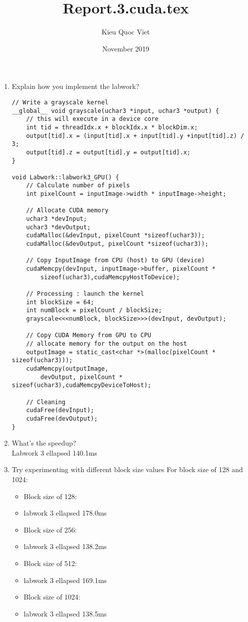 \documentclass{article}
\title{Report.3.cuda.tex}
\author{Kieu Quoc Viet }
\date{November 2019}
\begin{document}
\maketitle

\begin{enumerate}
    \item Explain how you implement the labwork?
    
    \begin{verbatim}
// Write a grayscale kernel
__global__ void grayscale(uchar3 *input, uchar3 *output) {
    // this will execute in a device core
    int tid = threadIdx.x + blockIdx.x * blockDim.x;
    output[tid].x = (input[tid].x + input[tid].y +input[tid].z) / 3;
    output[tid].z = output[tid].y = output[tid].x;
}

void Labwork::labwork3_GPU() {
    // Calculate number of pixels
    int pixelCount = inputImage->width * inputImage->height;
 
    // Allocate CUDA memory
    uchar3 *devInput;
    uchar3 *devOutput;
    cudaMalloc(&devInput, pixelCount *sizeof(uchar3));
    cudaMalloc(&devOutput, pixelCount *sizeof(uchar3));

    // Copy InputImage from CPU (host) to GPU (device)
    cudaMemcpy(devInput, inputImage->buffer, pixelCount * 
        sizeof(uchar3),cudaMemcpyHostToDevice);

    // Processing : launch the kernel
    int blockSize = 64;
    int numBlock = pixelCount / blockSize;  
    grayscale<<<numBlock, blockSize>>>(devInput, devOutput);
    
    // Copy CUDA Memory from GPU to CPU
    // allocate memory for the output on the host
    outputImage = static_cast<char *>(malloc(pixelCount * sizeof(uchar3)));  
    cudaMemcpy(outputImage, 
        devOutput, pixelCount * sizeof(uchar3),cudaMemcpyDeviceToHost);   

    // Cleaning
    cudaFree(devInput);
    cudaFree(devOutput);
}   
    \end{verbatim}
    
    \item What’s the speedup?\\
    Labwork 3 ellapsed 140.1ms

    \item Try experimenting with different block size values
    For block size of 128 and 1024:
        \begin{itemize}
        \item Block size of 128:
        \item [] labwork 3 ellapsed 178.0ms
        \item Block size of 256: 
        \item [] labwork 3 ellapsed 138.2ms
        \item Block size of 512:
        \item [] labwork 3 ellapsed 169.1ms
        \item Block size of 1024:
        \item [] labwork 3 ellapsed 138.5ms
    \end{itemize}
    
    
\end{enumerate}
\end{document}
